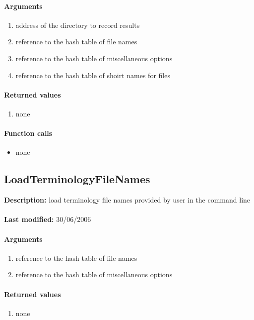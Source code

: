 \paragraph{Arguments}
\begin{enumerate}
\item address of the directory to record results
\item reference to the hash table of file names
\item reference to the hash table of miscellaneous options
\item reference to the hash table of shoirt names for files
\end{enumerate}

\paragraph{Returned values}
\begin{enumerate}
\item none
\end{enumerate}

\paragraph{Function calls}
\begin{itemize}
\item none
\end{itemize}

\subsection{LoadTerminologyFileNames}
\textbf{Description:} load terminology file names provided by user in the command line\\
\\\textbf{Last modified:} 30/06/2006

\paragraph{Arguments}
\begin{enumerate}
\item reference to the hash table of file names
\item reference to the hash table of miscellaneous options
\end{enumerate}

\paragraph{Returned values}
\begin{enumerate}
\item none
\end{enumerate}

